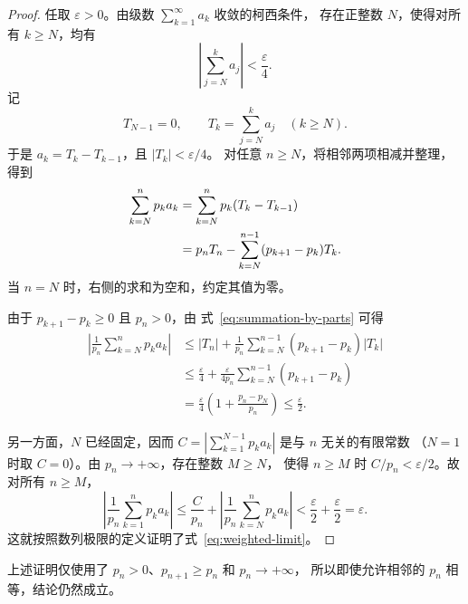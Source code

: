 \documentclass[UTF8,12pt,a4paper,fontset=fandol]{ctexart}
\begin{document}
\begin{proof}\color{black}
任取 $\varepsilon>0$。由级数 $\sum_{k=1}^{\infty}a_k$ 收敛的柯西条件，
存在正整数 $N$，使得对所有 $k\ge N$，均有
\[
  \left|\sum_{j=N}^{k}a_j\right|<\frac{\varepsilon}{4}.
\]
记
\[
  T_{N-1}=0,\qquad
  T_k=\sum_{j=N}^{k}a_j\quad(k\ge N).
\]
于是 $a_k=T_k-T_{k-1}$，且 $|T_k|<\varepsilon/4$。
对任意 $n\ge N$，将相邻两项相减并整理，得到
\begin{align}
  \sum_{k=N}^{n}p_ka_k
  &=\sum_{k=N}^{n}p_k(T_k-T_{k-1})\notag\\
  &=p_nT_n-\sum_{k=N}^{n-1}(p_{k+1}-p_k)T_k.
  \label{eq:summation-by-parts}
\end{align}
当 $n=N$ 时，右侧的求和为空和，约定其值为零。

由于 $p_{k+1}-p_k\ge0$ 且 $p_n>0$，由
式~\eqref{eq:summation-by-parts} 可得
\begin{align*}
  \left|\frac{1}{p_n}\sum_{k=N}^{n}p_ka_k\right|
  &\le |T_n|+
       \frac{1}{p_n}\sum_{k=N}^{n-1}(p_{k+1}-p_k)|T_k|\\
  &\le \frac{\varepsilon}{4}
       +\frac{\varepsilon}{4p_n}
        \sum_{k=N}^{n-1}(p_{k+1}-p_k)\\
  &=\frac{\varepsilon}{4}
       \left(1+\frac{p_n-p_N}{p_n}\right)
   \le\frac{\varepsilon}{2}.
\end{align*}

另一方面，$N$ 已经固定，因而
$C=\left|\sum_{k=1}^{N-1}p_ka_k\right|$ 是与 $n$ 无关的有限常数
（$N=1$ 时取 $C=0$）。由 $p_n\to+\infty$，存在整数 $M\ge N$，
使得 $n\ge M$ 时 $C/p_n<\varepsilon/2$。故对所有 $n\ge M$，
\[
  \left|\frac{1}{p_n}\sum_{k=1}^{n}p_ka_k\right|
  \le\frac{C}{p_n}
       +\left|\frac{1}{p_n}\sum_{k=N}^{n}p_ka_k\right|
  <\frac{\varepsilon}{2}+\frac{\varepsilon}{2}
  =\varepsilon.
\]
这就按照数列极限的定义证明了式~\eqref{eq:weighted-limit}。
\end{proof}

上述证明仅使用了 $p_n>0$、$p_{n+1}\ge p_n$ 和 $p_n\to+\infty$，
所以即使允许相邻的 $p_n$ 相等，结论仍然成立。
\end{document}
